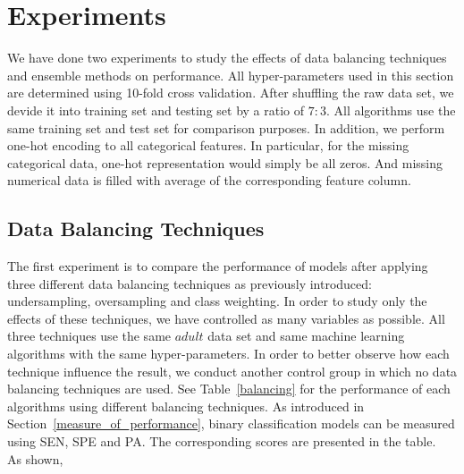 \documentclass{article}
\begin{document}
\section{Experiments}
\label{experiments}

We have done two experiments to study the effects of data balancing techniques and ensemble methods on performance. All hyper-parameters used in this section are determined using 10-fold cross validation. After shuffling the raw data set, we devide it into training set and testing set by a ratio of $7:3$. All algorithms use the same training set and test set for comparison purposes. In addition, we perform one-hot encoding to all categorical features. In particular, for the missing categorical data, one-hot representation would simply be all zeros. And missing numerical data is filled with average of the corresponding feature column.

\subsection{Data Balancing Techniques}
\label{balancing_experiment}

The first experiment is to compare the performance of models after applying three different data balancing techniques as previously introduced: undersampling, oversampling and class weighting. In order to study only the effects of these techniques, we have controlled as many variables as possible. All three techniques use the same $adult$ data set and same machine learning algorithms with the same hyper-parameters. In order to better observe how each technique influence the result, we conduct another control group in which no data balancing techniques are used. See Table~\ref{balancing} for the performance of each algorithms using different balancing techniques. As introduced in Section~\ref{measure_of_performance}, binary classification models can be measured using SEN, SPE and PA. The corresponding scores are presented in the table.\\

As shown,
\end{document}
